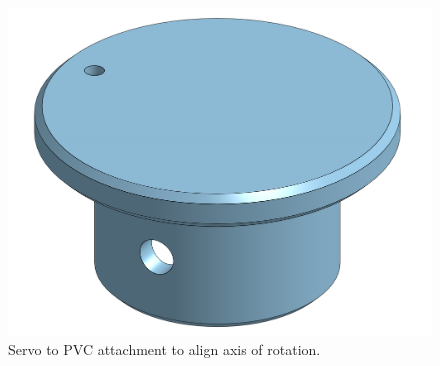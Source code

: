 \begin{figure}[htbp]
    \centering
    \includegraphics[width=0.4\linewidth]{Servo_to_PVC.png}
    \caption{Servo to PVC attachment to align axis of rotation.}
    \label{fig:servo-to-pvc}
\end{figure}

